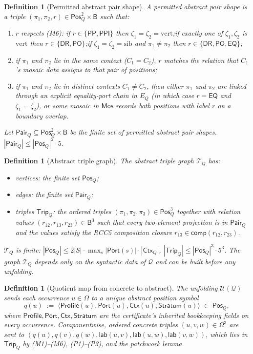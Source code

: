 \documentclass[11pt]{article}
\newtheorem{definition}[theorem]{Definition}
\newcommand{\Base}{\mathsf{B}}
\newcommand{\EQ}{\mathsf{EQ}}
\newcommand{\DR}{\mathsf{DR}}
\newcommand{\PO}{\mathsf{PO}}
\newcommand{\PP}{\mathsf{PP}}
\newcommand{\PPI}{\mathsf{PPI}}
\newcommand{\comp}{\mathsf{comp}}
\newcommand{\Q}{\mathcal Q}
\newcommand{\U}{\mathcal U}
\newcommand{\Mos}{\mathsf{Mos}}
\newcommand{\Ctx}{\mathsf{Ctx}}
\newcommand{\Port}{\mathsf{Port}}
\newcommand{\lab}{\mathsf{lab}}
\newcommand{\vertical}{\mathrm{vert}}
\newcommand{\sibling}{\mathrm{sib}}
\newcommand{\Pos}{\mathsf{Pos}}
\newcommand{\Pair}{\mathsf{Pair}}
\newcommand{\Trip}{\mathsf{Trip}}
\newcommand{\Profile}{\mathsf{Profile}}
\newcommand{\Stratum}{\mathsf{Stratum}}
\begin{document}
\begin{definition}[Permitted abstract pair shape]\label{def:abs-pair}
A permitted abstract pair shape is a triple
$(\pi_1,\pi_2,r)\in\Pos_Q^2\times\Base$ such that:
\begin{enumerate}[label=(P\arabic*)]
\item $r$ respects (M6): if $r\in\{\PP,\PPI\}$ then
$\zeta_1=\zeta_2=\vertical$;\@ if exactly one of $\zeta_1,\zeta_2$
is $\vertical$ then $r\in\{\DR,\PO\}$;\@ if $\zeta_1=\zeta_2=
\sibling$ and $\pi_1\neq\pi_2$ then $r\in\{\DR,\PO,\EQ\}$;
\item if $\pi_1$ and $\pi_2$ lie in the same context ($C_1=C_2$),
$r$ matches the relation that $C_1$'s mosaic data assigns to that
pair of positions;
\item if $\pi_1$ and $\pi_2$ lie in distinct contexts
$C_1\neq C_2$, then either $\pi_1$ and $\pi_2$ are linked through
an explicit equality-port chain in $E_Q$ (in which case $r=\EQ$ and
$\zeta_1=\zeta_2$), or some mosaic in $\Mos$ records both positions
with label $r$ on a boundary overlap.
\end{enumerate}
Let $\Pair_Q\subseteq\Pos_Q^2\times\Base$ be the finite set of
permitted abstract pair shapes.  $|\Pair_Q|\le|\Pos_Q|^2\cdot 5$.
\end{definition}

\begin{definition}[Abstract triple graph]\label{def:T-Q}
The abstract triple graph $\mathcal T_Q$ has:
\begin{itemize}
\item vertices: the finite set $\Pos_Q$;
\item edges: the finite set $\Pair_Q$;
\item triples $\Trip_Q$: the ordered triples
$(\pi_1,\pi_2,\pi_3)\in\Pos_Q^3$ together with relation values
$(r_{12},r_{13},r_{23})\in\Base^3$ such that every two-element
projection is in $\Pair_Q$ and the values satisfy the RCC5
composition closure $r_{13}\in\comp(r_{12},r_{23})$.
\end{itemize}
$\mathcal T_Q$ is finite: $|\Pos_Q|\le 2|S|\cdot
\max_s|\Port(s)|\cdot|\Ctx_Q|$, $|\Trip_Q|\le|\Pos_Q|^3\cdot 5^3$.
The graph $\mathcal T_Q$ depends only on the syntactic data of
$\Q$ and can be built before any unfolding.
\end{definition}

\begin{definition}[Quotient map from concrete to abstract]\label{def:quotient-map}
The unfolding $\U(\Q)$ sends each occurrence $u\in\Omega$ to a
unique abstract position symbol
\[
  q(u)\;:=\;\langle\Profile(u),\Port(u),\Ctx(u),\Stratum(u)\rangle\;\in\;\Pos_Q,
\]
where $\Profile,\Port,\Ctx,\Stratum$ are the certificate's
inherited bookkeeping fields on every occurrence.  Componentwise,
ordered concrete triples $(u,v,w)\in\Omega^3$ are sent to
$(q(u),q(v),q(w),\lab(u,v),\lab(u,w),\lab(v,w))$, which lies in
$\Trip_Q$ by (M1)--(M6), (P1)--(P3), and the patchwork lemma.
\end{definition}
\end{document}
